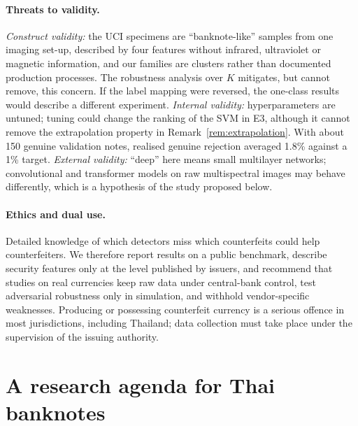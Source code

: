 \documentclass{article}
\theoremstyle{definition}
\theoremstyle{remark}
\begin{document}
\paragraph{Threats to validity.} \emph{Construct validity:} the UCI specimens are ``banknote-like'' samples from one imaging set-up, described by four features without infrared, ultraviolet or magnetic information, and our families are clusters rather than documented production processes. The robustness analysis over $K$ mitigates, but cannot remove, this concern. If the label mapping were reversed, the one-class results would describe a different experiment. \emph{Internal validity:} hyperparameters are untuned; tuning could change the ranking of the SVM in E3, although it cannot remove the extrapolation property in Remark~\ref{rem:extrapolation}. With about 150 genuine validation notes, realised genuine rejection averaged 1.8\% against a 1\% target. \emph{External validity:} ``deep'' here means small multilayer networks; convolutional and transformer models on raw multispectral images may behave differently, which is a hypothesis of the study proposed below.

\paragraph{Ethics and dual use.} Detailed knowledge of which detectors miss which counterfeits could help counterfeiters. We therefore report results on a public benchmark, describe security features only at the level published by issuers, and recommend that studies on real currencies keep raw data under central-bank control, test adversarial robustness only in simulation, and withhold vendor-specific weaknesses. Producing or possessing counterfeit currency is a serious offence in most jurisdictions, including Thailand; data collection must take place under the supervision of the issuing authority.

\section{A research agenda for Thai banknotes}
\label{sec:agenda}
\end{document}

